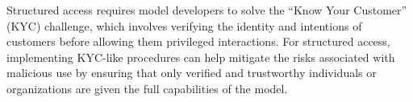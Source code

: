 Structured access requires model developers to solve the ``Know Your Customer'' (KYC) challenge, which involves verifying the identity and intentions of customers before allowing them privileged interactions. For structured access, implementing KYC-like procedures can help mitigate the risks associated with malicious use by ensuring that only verified and trustworthy individuals or organizations are given the full capabilities of the model. 






 









